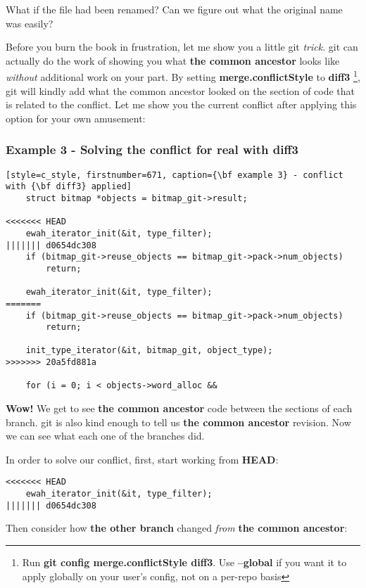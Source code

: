 What if the file had been renamed? Can we figure out what the original name was easily?

Before you burn the book in frustration, let me show you a little git {\it trick}. git can actually do the work of showing you what
{\bf the common ancestor} looks like {\it without } additional work on your part. By setting {\bf merge.conflictStyle} to
{\bf diff3} \footnote{ Run {\bf git config merge.conflictStyle diff3}. Use {\bf --global} if you want it to apply globally on
your user's config, not on a per-repo basis}, git will kindly add what the common ancestor looked on the section of code that is
related to the conflict. Let me show you the current conflict after applying this option for your own amusement:

\subsubsection{Example 3 - Solving the conflict for real with {\bf diff3}}
\begin{lstlisting}[style=c_style, firstnumber=671, caption={\bf example 3} - conflict with {\bf diff3} applied]
	struct bitmap *objects = bitmap_git->result;

<<<<<<< HEAD
	ewah_iterator_init(&it, type_filter);
||||||| d0654dc308
	if (bitmap_git->reuse_objects == bitmap_git->pack->num_objects)
		return;

	ewah_iterator_init(&it, type_filter);
=======
	if (bitmap_git->reuse_objects == bitmap_git->pack->num_objects)
		return;

	init_type_iterator(&it, bitmap_git, object_type);
>>>>>>> 20a5fd881a

	for (i = 0; i < objects->word_alloc &&
\end{lstlisting}

{\bf Wow!} We get to see {\bf the common ancestor} code between the sections of each branch. git is also kind enough to tell us
{\bf the common ancestor} revision. Now we can see what each one of the branches did.

In order to solve our conflict, first, start working from {\bf HEAD}:
\begin{lstlisting}[style=c_style, firstnumber=673, caption={\bf example 3} - step 1]
<<<<<<< HEAD
	ewah_iterator_init(&it, type_filter);
||||||| d0654dc308
\end{lstlisting}

Then consider how {\bf the other branch} changed {\it from} {\bf the common ancestor}:


